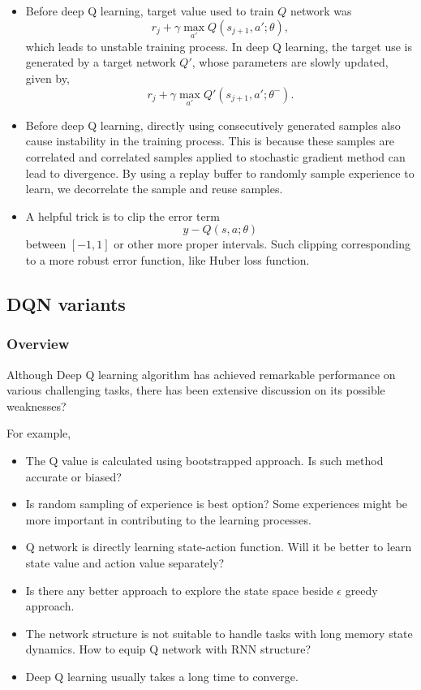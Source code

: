 \begin{refsection}
\begin{remark}
	\begin{itemize}
		\item Before deep Q learning, target value used to train $Q$ network was
		$$r_j + \gamma \max_{a'}Q(s_{j+1},a';\theta),$$
		which leads to unstable training process. In deep Q learning, the target use is generated by a target network $Q'$, whose parameters are slowly updated, given by,
		$$r_j + \gamma \max_{a'}Q'(s_{j+1},a';\theta^-).$$
		\item Before deep Q learning, directly using consecutively generated samples also cause instability in the training process. This is because these samples are correlated and correlated samples applied to stochastic gradient method can lead to divergence. By using a replay buffer to randomly sample experience to learn, we decorrelate the sample and reuse samples.
		\item A helpful trick is to clip the error term
		$$y -  Q(s,a;\theta)$$
		between $[-1,1]$ or other more proper intervals. Such clipping corresponding to a more robust error function, like Huber loss function.  
	\end{itemize}
\end{remark}






\subsection{DQN variants}

\subsubsection{Overview}

Although Deep Q learning algorithm has achieved remarkable performance on various challenging tasks, there has been extensive discussion on its possible weaknesses? 

For example, 
\begin{itemize}
	\item The Q value is calculated using bootstrapped approach. Is such method accurate or biased?
	\item Is random sampling of experience is best option? Some experiences might be more important in contributing to the learning processes.
	\item Q network is directly learning state-action function. Will it be better to learn state value and action value separately?
	\item Is there any better approach to explore the state space beside $\epsilon$ greedy approach.
	\item The network structure is not suitable to handle tasks with long memory state dynamics. How to equip Q network with RNN structure?
	\item Deep Q learning usually takes a long time to converge.    
\end{itemize} 


\end{refsection}
